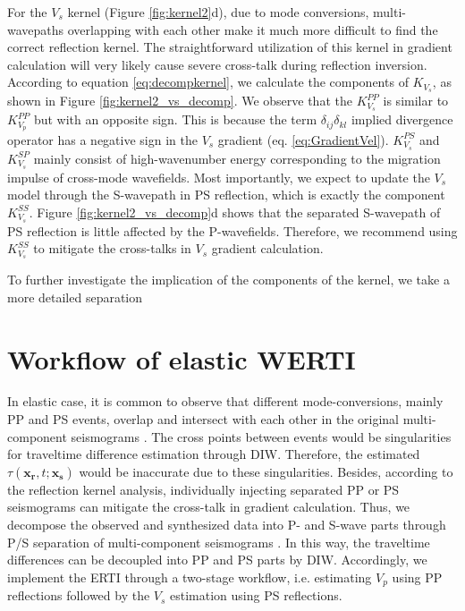 For the $V_s$ kernel (Figure \ref{fig:kernel2}d), due to mode conversions, multi-wavepaths overlapping with each other 
make it much more difficult to find the correct reflection kernel. 
The straightforward utilization of this kernel in gradient calculation will very likely cause severe
cross-talk during reflection inversion.
According to equation
\eqref{eq:decompkernel}, we calculate the components of $K_{V_s}$, as shown in Figure
\ref{fig:kernel2_vs_decomp}. We observe that the $K^{PP}_{V_s}$ is similar to $K^{PP}_{V_p}$ but with an opposite
sign. This is because the term $\delta_{ij}\delta_{kl}$ implied divergence operator has
a negative sign in the $V_s$ gradient (eq. \eqref{eq:GradientVel}).
$K^{PS}_{V_s}$ and $K^{SP}_{V_s}$ mainly consist of high-wavenumber energy
corresponding to the migration impulse of cross-mode wavefields. Most importantly, 
we expect to update the $V_s$ model through the S-wavepath in PS reflection, which is
exactly the component $K^{SS}_{V_s}$.  Figure \ref{fig:kernel2_vs_decomp}d shows that the
separated S-wavepath of PS reflection is little affected by the P-wavefields. 
{\color{red}Therefore, we recommend using $K^{SS}_{V_s}$ to mitigate the cross-talks in $V_s$ gradient calculation.
}

To further investigate the implication of the components of the kernel, we take a more detailed
separation 

\section{Workflow of elastic WERTI}
In elastic case, it is common to observe that different mode-conversions, mainly PP
and PS events, overlap and intersect with each other in the original multi-component
seismograms . The cross points between events
would be singularities for traveltime difference estimation through DIW.
Therefore, the estimated $\tau(\mathbf{x_r},t;\mathbf{x_s})$ would be inaccurate due
to these singularities.
Besides, according to the reflection kernel analysis, individually injecting separated
PP or PS seismograms
can mitigate the cross-talk in gradient calculation. 
Thus, we decompose the observed and synthesized data into P- and S-wave
parts through P/S separation of multi-component seismograms \cite[]{Li2016a}.
In this way, the traveltime differences can be decoupled into PP and
PS parts by DIW. Accordingly, we implement the ERTI through a two-stage
workflow, i.e. estimating $V_p$ using PP reflections followed by the $V_s$ estimation
using PS reflections.

